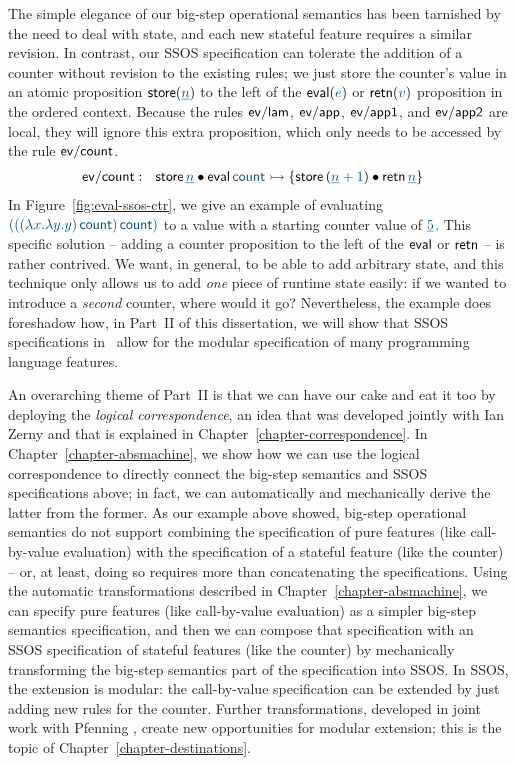 The simple elegance of our big-step operational semantics has been
tarnished by the need to deal with state, and each new stateful
feature requires a similar revision.  In contrast, our SSOS
specification can tolerate the addition of a counter without revision
to the existing rules; we just store the counter's value in an atomic
proposition ${\sf store}(\obj{\underline{n}})$ to the left of the ${\sf
  eval}(\obj{e})$ or ${\sf retn}(\obj{v})$ proposition in the ordered
context. Because the rules ${\sf ev/lam}$, ${\sf ev/app}$, ${\sf
  ev/app1}$, and ${\sf ev/app2}$ are local, they will ignore this
extra proposition, which only needs to be accessed by the rule ${\sf
  ev/count}$.
\begin{align*}
{\sf ev/count} &:~~
  {\sf store}\,\obj{\underline n} \fuse {\sf eval}\,\obj{{\sf count}}
    \lefti \{ {\sf store}\,(\obj{\underline n + 1}) 
      \fuse {\sf retn}\,\obj{\underline n} \}
\end{align*}
In Figure~\ref{fig:eval-ssos-ctr}, we give an example of evaluating
$\obj{(((\lambda x.\lambda y.y)\,{\sf count})\,{\sf count})}$ to a
value with a starting counter value of $\obj{\underline 5}$. This
specific solution -- adding a counter proposition to the left of the
${\sf eval}$ or ${\sf retn}$ -- is rather contrived. We want, in
general, to be able to add arbitrary state, and this technique only
allows us to add {\it one} piece of runtime state easily: if we wanted
to introduce a {\it second} counter, where would it go? Nevertheless,
the example does foreshadow how, in Part~II of this dissertation, we will
show that SSOS specifications in \sls~allow for the modular
specification of many programming language features.


An overarching theme of Part~II is that we can have our cake and eat
it too by deploying the {\it logical correspondence}, an idea that was
developed jointly with Ian Zerny and that is explained in
Chapter~\ref{chapter-correspondence}. In
Chapter~\ref{chapter-absmachine}, we show how we can use the logical
correspondence to directly connect the big-step semantics and SSOS
specifications above; in fact, we can automatically and mechanically
derive the latter from the former. As our example above showed,
big-step operational semantics do not support combining the
specification of pure features (like call-by-value evaluation) with
the specification of a stateful feature (like the counter) -- or, at
least, doing so requires more than concatenating the specifications.
Using the automatic transformations described in
Chapter~\ref{chapter-absmachine}, we can specify pure features (like
call-by-value evaluation) as a simpler big-step semantics
specification, and then we can compose that specification with an SSOS
specification of stateful features (like the counter) by mechanically
transforming the big-step semantics part of the specification into
SSOS. In SSOS, the extension is modular: the call-by-value
specification can be extended by just adding new rules for the
counter.  Further transformations, developed in joint work with
Pfenning \cite{simmons11logical}, create new opportunities for modular
extension; this is the topic of Chapter~\ref{chapter-destinations}.

